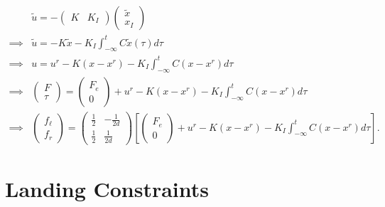 \documentclass{article}
\begin{document}
\begin{align*}
	&\tilde{u} = - \begin{pmatrix} K & K_I \end{pmatrix} \begin{pmatrix}\tilde{x} \\ x_I \end{pmatrix} \\	
	\implies & \tilde{u} = -K\tilde{x} - K_I \int_{-\infty}^t C\tilde{x}(\tau)d\tau \\
	\implies & u = u^r - K(x-x^r) - K_I\int_{-\infty}^t C(x-x^r)d\tau \\
	\implies & \begin{pmatrix}F \\ \tau \end{pmatrix} = \begin{pmatrix}F_e \\ 0 \end{pmatrix} +  u^r - K(x-x^r) - K_I\int_{-\infty}^t C(x-x^r)d\tau \\
	\implies & \begin{pmatrix}f_\ell \\ f_r \end{pmatrix} = \begin{pmatrix}\frac{1}{2} & -\frac{1}{2d} \\ \frac{1}{2} & \frac{1}{2d} \end{pmatrix}\left[ \begin{pmatrix}F_e \\ 0 \end{pmatrix} +  u^r - K(x-x^r) - K_I\int_{-\infty}^t C(x-x^r)d\tau \right].
\end{align*}

\section{Landing Constraints}
\end{document}

